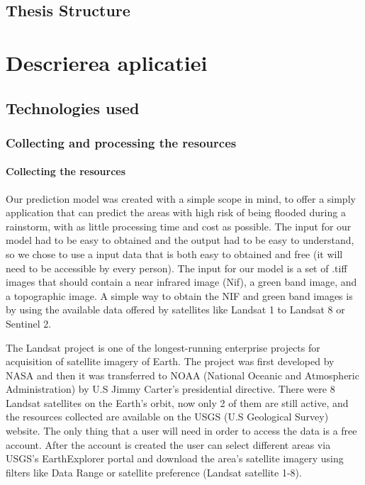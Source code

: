 \documentclass[12pt, a4paper]{report}
\begin{document}
\section{Thesis Structure}



\newpage{}


\chapter{Descrierea aplicatiei}

\section{Technologies used}

\subsection{Collecting and processing the resources}

\subsubsection{Collecting the resources}

\quad
Our prediction model was created with a simple scope in mind, to offer a simply  application that can predict the areas with high risk of being flooded during a rainstorm, with as little processing time and cost as possible. The input for our model had to be easy to obtained and the output had to be easy to understand, so we chose to use a input data that is both easy to obtained and free (it will need to be accessible by every person). The input for our model is a set of .tiff images that should contain a near infrared image (Nif), a green band image, and a topographic image. A simple way to obtain the NIF and green band images is by using the available data offered by satellites like Landsat 1 to Landsat 8 or Sentinel 2. 

\par 
The Landsat project is one of the longest-running enterprise projects for acquisition of satellite imagery of Earth. The project was first developed by NASA and then it was transferred to NOAA (National Oceanic and Atmospheric Administration) by U.S Jimmy Carter's presidential directive. There were 8 Landsat satellites on the Earth's orbit, now only 2 of them are still active, and the resources collected are available on the USGS (U.S Geological Survey) website. The only thing that a user will need in order to access the data is a free account. After the account is created the user can select different areas via USGS's EarthExplorer portal and download the area's satellite imagery using filters like Data Range or satellite preference (Landsat satellite 1-8).
\par
\end{document}
